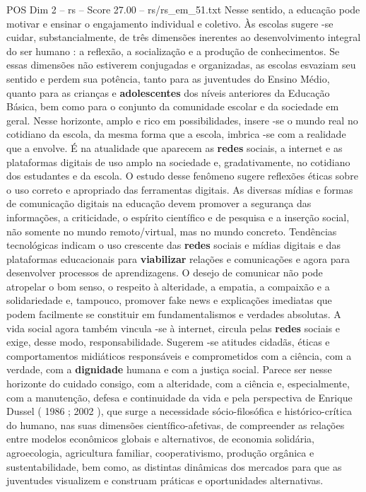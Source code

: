 \begin{textsample}{POS Dim 2 – rs – Score 27.00 – rs/rs\_em\_51.txt}
Nesse sentido, a educação pode motivar e ensinar o engajamento individual e coletivo.
Às escolas sugere -se cuidar, substancialmente, de três dimensões inerentes ao desenvolvimento integral do ser humano : a reflexão, a socialização e a produção de conhecimentos.
Se essas dimensões não estiverem conjugadas e organizadas, as escolas esvaziam seu sentido e perdem sua potência, tanto para as juventudes do Ensino Médio, quanto para as crianças e \textbf{adolescentes} dos níveis anteriores da Educação Básica, bem como para o conjunto da comunidade escolar e da sociedade em geral.
Nesse horizonte, amplo e rico em possibilidades, insere -se o mundo real no cotidiano da escola, da mesma forma que a escola, imbrica -se com a realidade que a envolve.
É na atualidade que aparecem as \textbf{redes} sociais, a internet e as plataformas digitais de uso amplo na sociedade e, gradativamente, no cotidiano dos estudantes e da escola.
O estudo desse fenômeno sugere reflexões éticas sobre o uso correto e apropriado das ferramentas digitais.
As diversas mídias e formas de comunicação digitais na educação devem promover a segurança das informações, a criticidade, o espírito científico e de pesquisa e a inserção social, não somente no mundo remoto/virtual, mas no mundo concreto.
Tendências tecnológicas indicam o uso crescente das \textbf{redes} sociais e mídias digitais e das plataformas educacionais para \textbf{viabilizar} relações e comunicações e agora para desenvolver processos de aprendizagens.
O desejo de comunicar não pode atropelar o bom senso, o respeito à alteridade, a empatia, a compaixão e a solidariedade e, tampouco, promover fake news e explicações imediatas que podem facilmente se constituir em fundamentalismos e verdades absolutas.
A vida social agora também vincula -se à internet, circula pelas \textbf{redes} sociais e exige, desse modo, responsabilidade.
Sugerem -se atitudes cidadãs, éticas e comportamentos midiáticos responsáveis e comprometidos com a ciência, com a verdade, com a \textbf{dignidade} humana e com a justiça social.
Parece ser nesse horizonte do cuidado consigo, com a alteridade, com a ciência e, especialmente, com a manutenção, defesa e continuidade da vida e pela perspectiva de Enrique Dussel ( 1986 ; 2002 ), que surge a necessidade sócio-filosófica e histórico-crítica do humano, nas suas dimensões científico-afetivas, de compreender as relações entre modelos econômicos globais e alternativos, de economia solidária, agroecologia, agricultura familiar, cooperativismo, produção orgânica e sustentabilidade, bem como, as distintas dinâmicas dos mercados para que as juventudes visualizem e construam práticas e oportunidades alternativas.

\end{textsample}
